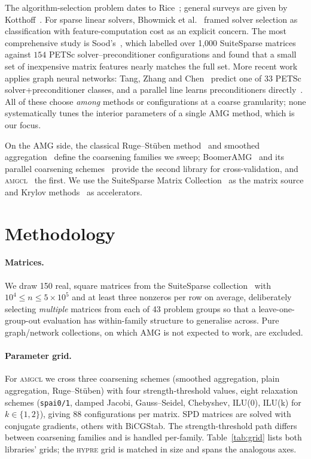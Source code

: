 \documentclass[acmsmall,screen,review]{acmart}
\newcommand{\amgcl}{\textsc{amgcl}}
\newcommand{\hypre}{\textsc{hypre}}
\begin{document}
The algorithm-selection problem dates to Rice~\cite{rice1976}; general surveys
are given by Kotthoff~\cite{kotthoff2016}. For sparse linear solvers,
Bhowmick et al.~\cite{bhowmick2009} framed solver selection as classification
with feature-computation cost as an explicit concern. The most comprehensive
study is Sood's~\cite{sood2019}, which labelled over 1{,}000 SuiteSparse
matrices against $154$ PETSc solver--preconditioner configurations and found
that a small set of inexpensive matrix features nearly matches the full set.
More recent work applies graph neural networks: Tang, Zhang and
Chen~\cite{tang2022} predict one of 33 PETSc solver+preconditioner classes,
and a parallel line learns preconditioners directly~\cite{chen2024gnp,
hausner2025}. All of these choose \emph{among} methods or configurations at a
coarse granularity; none systematically tunes the interior parameters of a
single AMG method, which is our focus.

On the AMG side, the classical Ruge--St\"uben method~\cite{ruge1987} and
smoothed aggregation~\cite{vanek1996} define the coarsening families we sweep;
BoomerAMG~\cite{henson2002,hypre} and its parallel coarsening
schemes~\cite{desterck2006} provide the second library for cross-validation,
and \amgcl{}~\cite{amgcl} the first. We use the SuiteSparse Matrix
Collection~\cite{davis2011} as the matrix source and Krylov
methods~\cite{hestenes1952,saad1986,vandervorst1992,saad2003} as accelerators.

\section{Methodology}
\label{sec:method}

\paragraph{Matrices.}
We draw 150 real, square matrices from the SuiteSparse
collection~\cite{davis2011} with $10^4 \le n \le 5\times10^5$ and at least
three nonzeros per row on average, deliberately selecting \emph{multiple}
matrices from each of 43 problem groups so that a leave-one-group-out
evaluation has within-family structure to generalise across. Pure
graph/network collections, on which AMG is not expected to work, are excluded.

\paragraph{Parameter grid.}
For \amgcl{} we cross three coarsening schemes (smoothed aggregation,
plain aggregation, Ruge--St\"uben) with four strength-threshold values, eight
relaxation schemes (\texttt{spai0/1}, damped Jacobi, Gauss--Seidel, Chebyshev,
ILU(0), ILU(k) for $k\in\{1,2\}$), giving 88 configurations per matrix. SPD
matrices are solved with conjugate gradients, others with BiCGStab. The
strength-threshold path differs between coarsening families and is handled
per-family. Table~\ref{tab:grid} lists both libraries' grids; the \hypre{}
grid is matched in size and spans the analogous axes.
\end{document}
